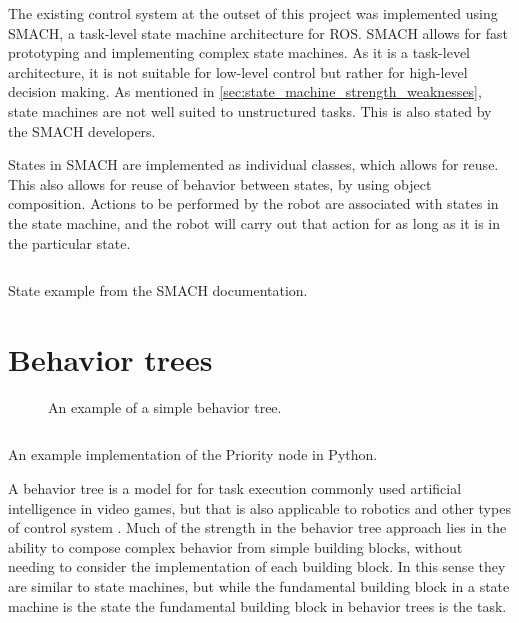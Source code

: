 \documentclass[\rootfolder/main.tex]{subfiles}
\begin{document}
The existing control system at the outset of this project was implemented using SMACH, a task-level state machine architecture for ROS.
SMACH allows for fast prototyping and implementing complex state machines.
As it is a task-level architecture, it is not suitable for low-level control but rather for high-level decision making.
As mentioned in \cref{sec:state_machine_strength_weaknesses}, state machines are not well suited to unstructured tasks.
This is also stated by the SMACH developers.

States in SMACH are implemented as individual classes, which allows for reuse.
This also allows for reuse of behavior between states, by using object composition.
Actions to be performed by the robot are associated with states in the state machine, and the robot will carry out that action for as long as it is in the particular state.

\begin{listing}
\inputminted{python}{\rootfolder/Chapters/Chapter2/Listings/smachstate.py}
\caption{State example from the SMACH documentation.}
\end{listing}


\section{Behavior trees}

\begin{wrapfigure}{L}{0.5\columnwidth}
    \caption{An example of a simple behavior tree.}
    \label{fig:bt}
\end{wrapfigure}

\begin{listing}
    \inputminted{python}{\rootfolder/Chapters/Chapter2/Listings/priority.py}
    \caption{An example implementation of the Priority node in Python.\label{lst:priority}}
\end{listing}

A behavior tree is a model for for task execution commonly used artificial intelligence in  video games, but that is also applicable to robotics and other types of control system \cite{Millington2009}.
Much of the strength in the behavior tree approach lies in the ability to compose complex behavior from simple building blocks, without needing to consider the implementation of each building block.
In this sense they are similar to state machines, but while the fundamental building block in a state machine is the state the fundamental building block in behavior trees is the task.
\end{document}

